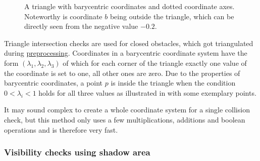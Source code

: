 			\begin{figure}[h]
				\begin{figcenter}
				\end{figcenter}
				\caption{A triangle with barycentric coordinates and dotted coordinate axes. Noteworthy is coordinate $b$ being outside the triangle, which can be directly seen from the negative value $-0.2$.}
				\label{fig:barycentric-triangle}
			\end{figure}
			
			Triangle intersection checks are used for closed obstacles, which got triangulated during \hyperref[subsec:step-1-preprocessing]{preprocessing}.
			Coordinates in a barycentric coordinate system have the form $(\lambda_1,\lambda_2,\lambda_3)$ of which for each corner of the triangle exactly one value of the coordinate is set to one, all other ones are zero.
			Due to the properties of barycentric coordinates, a point $p$ is inside the triangle when the condition $0 < \lambda_i < 1$ holds for all three values as illustrated in  with some exemplary points.
			
			It may sound complex to create a whole coordinate system for a single collision check, but this method only uses a few multiplications, additions and boolean operations and is therefore very fast.
			
		\subsubsection{Visibility checks using shadow area}
			
